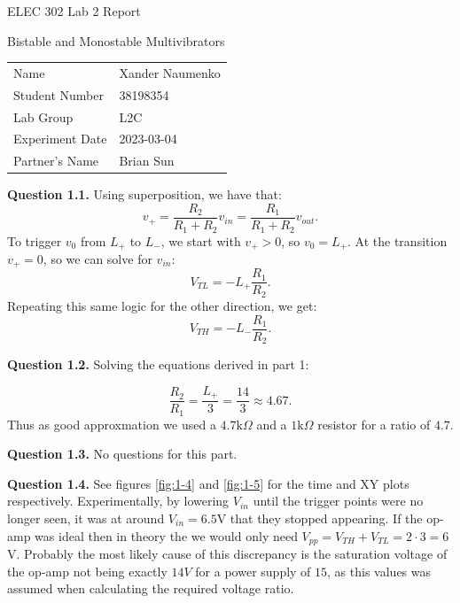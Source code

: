 \documentclass[letterpaper, reqno,11pt]{article}
\begin{document}

\begin{titlepage}
\centering


\Large ELEC 302 Lab 2 Report


\normalsize Bistable and Monostable Multivibrators


\begin{tabular}{ll}
Name & Xander Naumenko \\[2ex]
Student Number  & 38198354 \\[2ex]
Lab Group            & L2C \\[2ex]
Experiment Date            & 2023-03-04 \\[2ex]
Partner's Name &  Brian Sun
\end{tabular}



\end{titlepage}

{\medskip\noindent\bf Question 1.1.} Using superposition, we have that:
\[
v_{+}= \frac{R_2}{R_1+R_2}v_{in}= \frac{R_1}{R_1+R_2}v_{out}
.\]
To trigger $v_0$ from $L_+$ to $L_-$, we start with $v_+>0$, so $v_0=L_+$. At the transition $v_+=0$, so we can solve for $v_{in}$:
\[
V_{TL}=-L_+ \frac{R_1}{R_2}
.\]
Repeating this same logic for the other direction, we get:
\[
V_{TH}= -L_- \frac{R_1}{R_2}
.\]

{\medskip\noindent\bf Question 1.2.} Solving the equations derived in part 1:

\[
\frac{R_2}{R_1}=\frac{L_+}{3}=\frac{14}{3}\approx 4.67
.\]
Thus as  good approxmation we used a $4.7\text{k}\Omega$ and a $1\text{k}\Omega$ resistor for a ratio of $4.7$.

{\medskip\noindent\bf Question 1.3.} No questions for this part.

{\medskip\noindent\bf Question 1.4.} See figures \ref{fig:1-4} and \ref{fig:1-5} for the time and XY plots respectively. Experimentally, by lowering $V_{in}$ until the trigger points were no longer seen, it was at around $V_{in}=6.5$V that they stopped appearing. If the op-amp was ideal then in theory the we would only need $V_{pp}=V_{TH}+V_{TL}=2\cdot 3=6$V. Probably the most likely cause of this discrepancy is the saturation voltage of the op-amp not being exactly $14V$ for a power supply of $15$, as this values was assumed when calculating the required voltage ratio.
\end{document}
